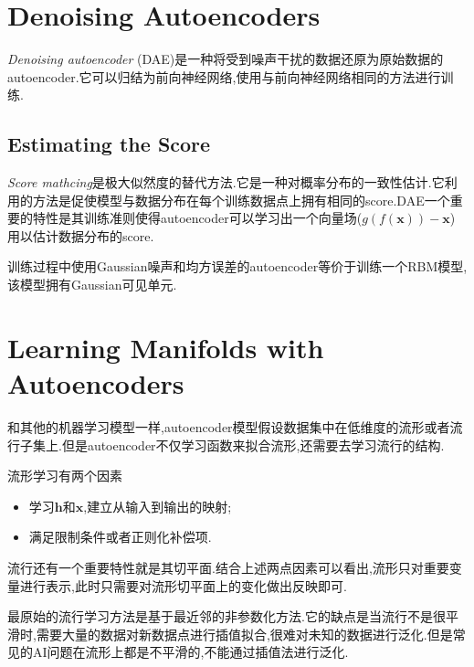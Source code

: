 \section{Denoising Autoencoders}

\textit{Denoising autoencoder} (DAE)是一种将受到噪声干扰的数据还原为原始数据的autoencoder.它可以归结为前向神经网络,使用与前向神经网络相同的方法进行训练.

\subsection{Estimating the Score}

\textit{Score mathcing}是极大似然度的替代方法.它是一种对概率分布的一致性估计.它利用的方法是促使模型与数据分布在每个训练数据点上拥有相同的score.DAE一个重要的特性是其训练准则使得autoencoder可以学习出一个向量场($g(f(\mathbf x))-\mathbf x$)用以估计数据分布的score.

训练过程中使用Gaussian噪声和均方误差的autoencoder等价于训练一个RBM模型,该模型拥有Gaussian可见单元.

\section{Learning Manifolds with Autoencoders}

和其他的机器学习模型一样,autoencoder模型假设数据集中在低维度的流形或者流行子集上.但是autoencoder不仅学习函数来拟合流形,还需要去学习流行的结构.

流形学习有两个因素
\begin{itemize}
    \item 学习$\mathbf h$和$\mathbf x$,建立从输入到输出的映射;
    \item 满足限制条件或者正则化补偿项.
\end{itemize}

流行还有一个重要特性就是其切平面.结合上述两点因素可以看出,流形只对重要变量进行表示,此时只需要对流形切平面上的变化做出反映即可.

最原始的流行学习方法是基于最近邻的非参数化方法.它的缺点是当流行不是很平滑时,需要大量的数据对新数据点进行插值拟合,很难对未知的数据进行泛化.但是常见的AI问题在流形上都是不平滑的,不能通过插值法进行泛化.